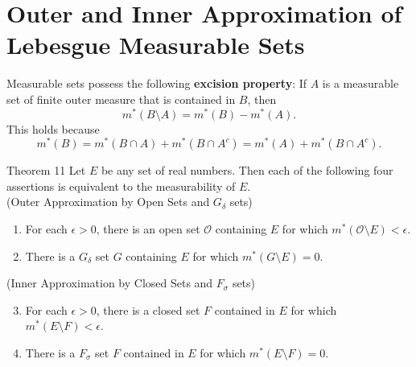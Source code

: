 \section{Outer and Inner Approximation of Lebesgue Measurable Sets}
\begin{flushleft}
	
	Measurable sets possess the following \textbf{excision property}: If $A$ is a measurable set of finite outer measure that is contained in $B$, then 
	\[
		m^*(B\setminus A)=m^*(B)-m^*(A).	
	\]
	This holds because
	\[
		m^*(B)=m^*(B\cap A)+m^*(B\cap A^c)=m^*(A)+m^*(B\cap A^c).	
	\]

\end{flushleft}
\begin{namedthm*}{Theorem 11}
	Let $E$ be any set of real numbers. Then each of the following four assertions is equivalent to the measurability of $E$.\\
	(Outer Approximation by Open Sets and $G_\delta$ sets)
	\begin{enumerate}[label=(\roman*),align=left]
        \item For each $\epsilon>0$, there is an open set $\mathcal{O}$ containing $E$ for which $m^*(\mathcal{O}\setminus E)<\epsilon$.
        \item There is a $G_\delta$ set $G$ containing $E$ for which $m^*(G\setminus E)=0$. 
    \end{enumerate}
	(Inner Approximation by Closed Sets and $F_\sigma$ sets)
	\begin{enumerate}[label=(\roman*),align=left]
        \setcounter{enumi}{2}
		\item For each $\epsilon>0$, there is a closed set $F$ contained in $E$ for which $m^*(E\setminus F)<\epsilon$.
        \item There is a $F_\sigma$ set $F$ contained in $E$ for which $m^*(E\setminus F)=0$.
    \end{enumerate}
\end{namedthm*}
